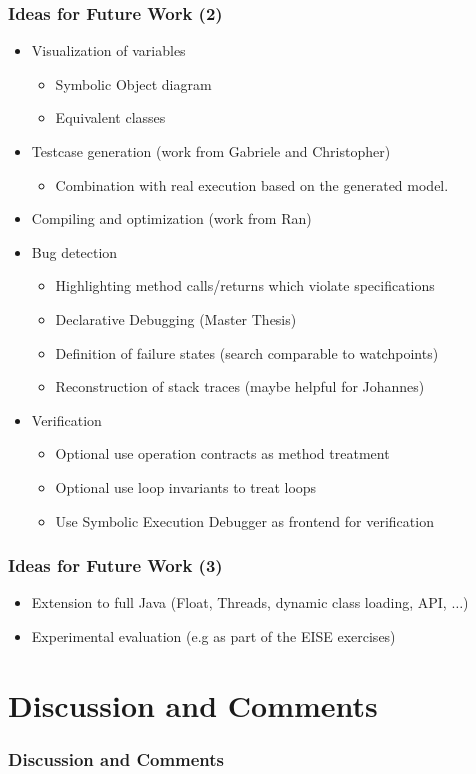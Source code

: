 \documentclass[accentcolor=tud9d,colorbacktitle,inverttitle,landscape,english,presentation,t]{tudbeamer}
\begin{document}
   \begin{frame}[t]
		\frametitle{Ideas for Future Work (2)}
      
      \begin{itemize}
         \item Visualization of variables
               \begin{itemize}
                  \item Symbolic Object diagram
                  \item Equivalent classes
               \end{itemize}
         \item Testcase generation (work from Gabriele and Christopher)
               \begin{itemize}
                  \item Combination with real execution based on the generated model.
               \end{itemize}
         \item Compiling and optimization (work from Ran)
         \item Bug detection
               \begin{itemize}
                  \item Highlighting method calls/returns which violate specifications
                  \item Declarative Debugging (Master Thesis)
                  \item Definition of failure states (search comparable to watchpoints)
                  \item Reconstruction of stack traces (maybe helpful for Johannes)
               \end{itemize}
         \item Verification
               \begin{itemize}
                  \item Optional use operation contracts as method treatment
                  \item Optional use loop invariants to treat loops
                  \item Use Symbolic Execution Debugger as frontend for verification
               \end{itemize}
      \end{itemize}
	\end{frame}
   
   \begin{frame}[t]
		\frametitle{Ideas for Future Work (3)}
      
      \begin{itemize}
         \item Extension to full Java (Float, Threads, dynamic class loading, API, $\dots$)
         \item Experimental evaluation (e.g as part of the EISE exercises)
      \end{itemize}
	\end{frame}
   
\section{Discussion and Comments}
   
   \begin{frame}[t]
		\frametitle{Discussion and Comments}
	\end{frame}
\end{document}
